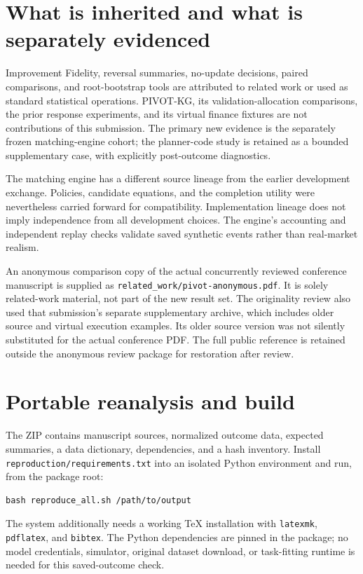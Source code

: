 \documentclass[10pt,letterpaper]{article}
\begin{document}
\section{What is inherited and what is separately evidenced}
Improvement Fidelity, reversal summaries, no-update decisions, paired comparisons, and root-bootstrap tools are attributed to related work \citep{pivot} or used as standard statistical operations. PIVOT-KG, its validation-allocation comparisons, the prior response experiments, and its virtual finance fixtures are not contributions of this submission. The primary new evidence is the separately frozen matching-engine cohort; the planner-code study is retained as a bounded supplementary case, with explicitly post-outcome diagnostics.

The matching engine has a different source lineage from the earlier development exchange. Policies, candidate equations, and the completion utility were nevertheless carried forward for compatibility. Implementation lineage does not imply independence from all development choices. The engine's accounting and independent replay checks validate saved synthetic events rather than real-market realism.

An anonymous comparison copy of the actual concurrently reviewed conference manuscript is supplied as \texttt{related\_work/pivot-anonymous.pdf}. It is solely related-work material, not part of the new result set. The originality review also used that submission's separate supplementary archive, which includes older source and virtual execution examples. Its older source version was not silently substituted for the actual conference PDF. The full public reference is retained outside the anonymous review package for restoration after review.

\section{Portable reanalysis and build}
The ZIP contains manuscript sources, normalized outcome data, expected summaries, a data dictionary, dependencies, and a hash inventory. Install \texttt{reproduction/requirements.txt} into an isolated Python environment and run, from the package root:
\begin{verbatim}
bash reproduce_all.sh /path/to/output
\end{verbatim}
The system additionally needs a working TeX installation with \texttt{latexmk}, \texttt{pdflatex}, and \texttt{bibtex}. The Python dependencies are pinned in the package; no model credentials, simulator, original dataset download, or task-fitting runtime is needed for this saved-outcome check.
\end{document}
